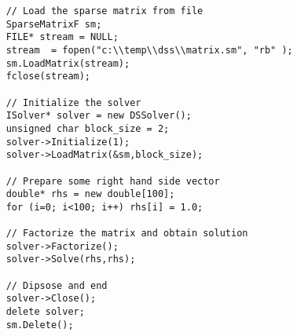 \documentclass[12pt]{article}
\begin{document}
\begin{verbatim}
	// Load the sparse matrix from file
	SparseMatrixF sm;
	FILE* stream = NULL;
	stream  = fopen("c:\\temp\\dss\\matrix.sm", "rb" );
	sm.LoadMatrix(stream);
	fclose(stream);

	// Initialize the solver
	ISolver* solver = new DSSolver();
	unsigned char block_size = 2;
	solver->Initialize(1);
	solver->LoadMatrix(&sm,block_size);

	// Prepare some right hand side vector
	double* rhs = new double[100];	
	for (i=0; i<100; i++) rhs[i] = 1.0;

	// Factorize the matrix and obtain solution
	solver->Factorize();
	solver->Solve(rhs,rhs);

	// Dipsose and end
	solver->Close();
	delete solver;
	sm.Delete();
\end{verbatim}
\end{document}
